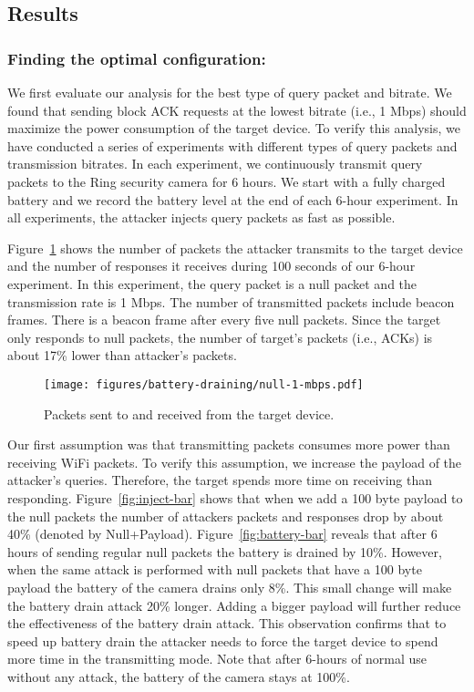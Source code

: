 \subsection{Results\\} \label{sec:wifi-results}
\vspace{-20pt}
\subsubsection{Finding the optimal configuration:}
We first evaluate our analysis for the best type of query packet and bitrate.
We found that sending block ACK requests at the lowest bitrate (i.e., 1 Mbps) should maximize the power consumption of the target device.
To verify this analysis, we have conducted a series of experiments with different types of query packets and transmission bitrates.
In each experiment, we continuously transmit query packets to the Ring security camera for 6 hours.
We start with a fully charged battery and we record the battery level at the end of each 6-hour experiment.
In all experiments, the attacker injects query packets as fast as possible.

Figure~\ref{fig:inject-time} shows the number of packets the attacker transmits to the target device and the number of responses it receives during 100 seconds of our 6-hour experiment.
In this experiment, the query packet is a null packet and the transmission rate is 1 Mbps.
The number of transmitted packets include beacon frames. There is a beacon frame after every five null packets. Since the target only responds to null packets, the number of target's packets (i.e., ACKs) is about 17\% lower than attacker's packets. 


\begin{figure}
    \centering
    \texttt{[image: figures/battery-draining/null-1-mbps.pdf]}
    \vspace{-10pt}
    \caption{Packets sent to and received from the target device.}
    \vspace{-15pt}
    \label{fig:inject-time}
\end{figure}

Our first assumption was that transmitting packets consumes more power than receiving WiFi packets. 
To verify this assumption, we increase the payload of the attacker's queries. Therefore, the target spends more time on receiving than responding. Figure~\ref{fig:inject-bar} shows that when we add a 100 byte payload to the null packets the number of attackers packets and responses drop by about 40\% (denoted by Null+Payload).
Figure~\ref{fig:battery-bar} reveals that after 6 hours of sending regular null packets the battery is drained by 10\%. However, when the same attack is performed with null packets that have a 100 byte payload the battery of the camera drains only 8\%. This small change will make the battery drain attack 20\% longer.
Adding a bigger payload will further reduce the effectiveness of the battery drain attack.
This observation confirms that to speed up battery drain the attacker needs to force the target device to spend more time in the transmitting mode.
Note that after 6-hours of normal use without any attack, the battery of the camera stays at 100\%.

